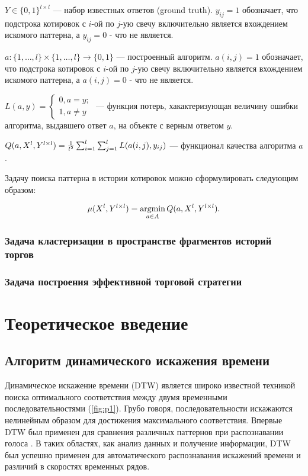 \documentclass[a4paper, 14pt]{extarticle}
\numberwithin{figure}{subsection}
\let\oldautoref\autoref
\renewcommand{\autoref}[1]{(\oldautoref{#1})}
\numberwithin{equation}{subsection}
\begin{document}
$Y \in \{0, 1\}^{l \times l}$ --- набор известных ответов (ground truth). $y_{ij} = 1$ обозначает, что подстрока котировок с $i$-ой по $j$-ую свечу включительно является вхождением искомого паттерна, а $y_{ij} = 0$ - что не является.

$a: \{1, \dots, l\} \times \{1, \dots, l\} \rightarrow \{0, 1\}$ --- построенный алгоритм. $a(i, j) = 1$ обозначает, что подстрока котировок с $i$-ой по $j$-ую свечу включительно является вхождением искомого паттерна, а $a(i, j) = 0$ - что не является.

$L(a, y) = 
\begin{cases}
0, a = y;\\
1, a \ne y
\end{cases}$ --- функция потерь, хакактеризующая величину ошибки алгоритма, выдавшего ответ $a$, на объекте с верным ответом $y$.

$Q(a, X^l, Y^{l \times l}) = {1 \over {l^2}}\sum_{i=1}^l\sum_{j=1}^l L(a(i, j), y_{ij})$ --- функционал качества алгоритма $a$.

Задачу поиска паттерна в истории котировок можно сформулировать следующим образом:

\begin{equation}
	\mu(X^l, Y^{l \times l}) = \operatornamewithlimits{argmin}\limits_{a \in A} Q(a, X^l, Y^{l \times l}).
\end{equation}

\subsubsection{Задача кластеризации в пространстве фрагментов историй торгов}
\subsubsection{Задача построения эффективной торговой стратегии}
\section{Теоретическое введение}
\subsection{Алгоритм динамического искажения времени}
Динамическое искажение времени (DTW) является широко известной техникой поиска оптимального соответствия между двумя временными последовательностями \autoref{fig:p1}. Грубо говоря, последовательности искажаются нелинейным образом для достижения максимального соответствия. Впервые DTW был применен для сравнения различных паттернов при распознавании голоса \cite{wjb87}.  В таких областях, как анализ данных и получение информации, DTW был успешно применен для автоматического распознавания искажений времени и различий в скоростях временных рядов.
\end{document}
